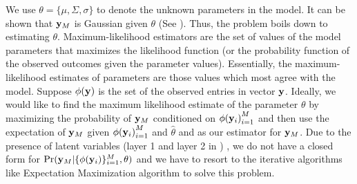 \begin{comment}
\vspace{-0.35em}
\begin{algorithm}[h]
\caption{\SYSTEM{} algorithm for power estimation}
\begin{algorithmic}[1]
\REQUIRE M $\leftarrow$ Number of applications, n $\leftarrow$ Number of configurations. $\{\y_i\}_{i = 1}^{M}$ $\leftarrow$ Power measurements for M applications. $\Omega_i$  $\leftarrow$ Known indices in $\y_i$. $\Omega$  $\leftarrow$ $ \{\Omega_i\}_{i = 1}^{M}$, $\epsilon \leftarrow \text{Tolerance to control convergence}$.

\STATE Construct indicator matrix $L \in \R^{n x M}$ from $\Omega$. $L_i(j) = 1$ if $j \in \Omega_i$, $L_i(j) = 0$ otherwise. 
\STATE Initialize $\theta = \mu, \Sigma,\sigma$ and likelihood $\hat{\textit{L}}_0, \epsilon$.
\STATE Set $\hat{\textit{L}}  = 2\hat{\textit{L}}_0 $.
\REPEAT
	\STATE Expectation step: Compute $C_i$ and $\hat{\z}_i$ using \eqref{eq:conditionals}, 
	\STATE Maximization step: Compute $\theta = (\mu, \Sigma, \sigma)$ using \eqref{eq:maximization},
	\STATE Calculate likelihood $\hat{\textit{L}}  = \textit{L} \left(\theta  \vert \{ \phi(y_i ) \}^M, \{ \hat{\z}_i\}^M \right)$ using Equation \eqref{eq:likelihood}. 
	\STATE Set $\hat{\textit{L}}  = \hat{\textit{L}}_0  $.
\UNTIL{$\frac{\|  \hat{\textit{L}} - \hat{\textit{L}}_0  \|}{\hat{\textit{L}}_0 } > \epsilon$}
\STATE $ \hat{\y}_M = \hat{\z}_M$
\RETURN $ \hat{\y}_M$.
\end{algorithmic}
\label{alg:LEO}
\end{algorithm}
\end{comment}
We use $\theta = \{\mu, \Sigma, \sigma\}$ to denote the unknown
parameters in the model. It can be shown that $\mathbf{y}_M$ is Gaussian given
$\theta$ (See \cite{yu2005learning}). %
 Thus, the problem boils down to estimating $\theta$.  Maximum-likelihood
estimators are the set of values of the model parameters that
maximizes the likelihood function (or the probability function of the
observed outcomes given the parameter values).  Essentially, the
maximum-likelihood estimates of parameters are those values which most
agree with the model. Suppose $\phi(\mathbf{y})$ is the set of the observed
entries in vector $\mathbf{y}$. Ideally, we would like to find the maximum
likelihood estimate of the parameter $\theta$ by maximizing the
probability of $\mathbf{y}_M$ conditioned on ${\phi(\mathbf{y}_i)}_{i = 1}^{M}$ and
then use the expectation of $\mathbf{y}_M$ given ${\phi(\mathbf{y}_i)}_{i = 1}^{M}$
and $\hat{\theta}$ and as our estimator for $\mathbf{y}_M$. Due to the presence of latent variables (layer 1 and layer 2 in ) , we do not have a closed form for $\Pr( \mathbf{y}_M | \{\phi(\mathbf{y}_i)\}_{i = 1}^{M}, \theta )$
and we have to resort to the iterative algorithms like Expectation
Maximization algorithm to solve this problem.


